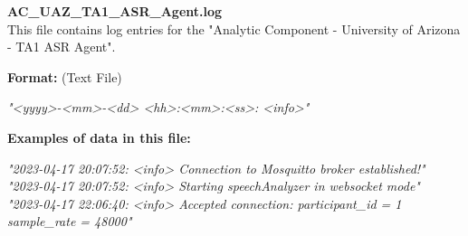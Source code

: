 \begin{description}
\begin{addmargin}[0em]{0em}
    \label{AC_UAZ_TA1_ASR_Agent.log}
    \begin{addmargin}[1em]{0em} %
        \textbf{AC\_UAZ\_TA1\_ASR\_Agent.log}\\
        This file contains log entries for the "Analytic Component - University of Arizona - TA1 ASR Agent".
        \begin{addmargin}[1em]{0em}
            \textbf{Format:} (Text File)
            \begin{addmargin}[1em]{0em}
                \textit{"<yyyy>-<mm>-<dd> <hh>:<mm>:<ss>: <info>"}
            \end{addmargin}
        \end{addmargin}
        \begin{addmargin}[1em]{0em}
            \textbf{Examples of data in this file:}
            \begin{addmargin}[1em]{0em}\textit{"2023-04-17 20:07:52: <info> Connection to Mosquitto broker established!"\\
                "2023-04-17 20:07:52: <info> Starting speechAnalyzer in websocket mode"\\
                "2023-04-17 22:06:40: <info> Accepted connection: participant\_id = 1 sample\_rate = 48000"}
            \end{addmargin}
        \end{addmargin}
    \end{addmargin} %
    \textbf{\\}


\end{addmargin}
\end{description}
